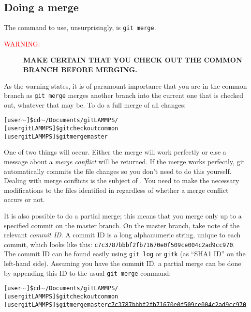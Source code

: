 \documentclass[a4paper,oneside,11pt]{article}
\begin{document}
\subsection{Doing a merge}
The command to use, unsurprisingly, is \texttt{git merge}.
\begin{description}
 \item[\textcolor{red}{WARNING:}] \bfseries\MakeUppercase{Make certain that you check out the common branch before merging.}
\end{description}
As the warning states, it is of paramount importance that you are in the common branch as \texttt{git merge} merges another branch into the current one that is checked out, whatever that may be. To do a full merge of all changes:
\begin{alltt}
[user \(\sim\)]\$ cd \(\sim\)/Documents/gitLAMMPS/
[user gitLAMMPS]\$ git checkout common
[user gitLAMMPS]\$ git merge master
\end{alltt}
One of two things will occur. Either the merge will work perfectly or else a message about a \emph{merge conflict} will be returned. If the merge works perfectly, git automatically commits the file changes so you don't need to do this yourself. Dealing with merge conflicts is the subject of . You need to make the necessary modifications to the files identified in  regardless of whether a merge conflict occurs or not.

It is also possible to do a partial merge; this means that you merge only up to a specified commit on the master branch. On the master branch, take note of the relevant \emph{commit ID}. A commit ID is a long alphanumeric string, unique to each commit, which looks like this: \texttt{c7c3787bbbf2fb71670e0f509ce004c2ad9cc970}. The commit ID can be found easily using \texttt{git log} or \texttt{gitk} (as ``SHA1 ID'' on the left-hand side). Assuming you have the commit ID, a partial merge can be done by appending this ID to the usual \texttt{git merge} command:
\begin{alltt}
[user \(\sim\)]\$ cd \(\sim\)/Documents/gitLAMMPS/
[user gitLAMMPS]\$ git checkout common
[user gitLAMMPS]\$ git merge master \sout{c7c3787bbbf2fb71670e0f509ce004c2ad9cc970}
\end{alltt}
\end{document}
